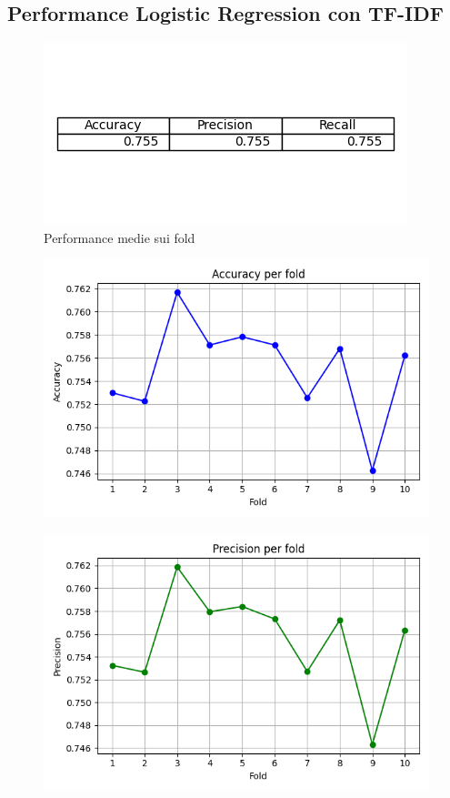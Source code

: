 \documentclass[12pt,a4paper]{report} %
\begin{document}
\subsection{Performance Logistic Regression con TF-IDF}
\begin{figure}[H]
    \centering
    \includegraphics[width=0.75\linewidth]{immagini_modeling/lr_tfidf.png}
    \caption{Performance medie sui fold}
    \label{fig:enter-label}
\end{figure}
\begin{figure}[H]
    \centering
    \includegraphics[width=0.75\linewidth]{immagini_modeling/accuracy_lr_tfidf.png}
    
    \label{fig:enter-label}
\end{figure}
\begin{figure}[H]
    \centering
    \includegraphics[width=0.75\linewidth]{immagini_modeling/precision_lr_tfidf.png}
    
    \label{fig:enter-label}
\end{figure}
\end{document}
